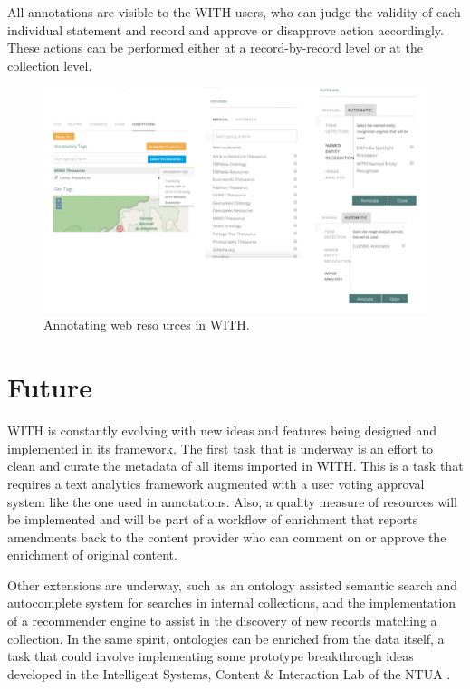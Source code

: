 \documentclass[runningheads,a4paper]{llncs}
\makeatletter
\def\maxwidth#1{\ifdim\Gin@nat@width>#1 #1\else\Gin@nat@width\fi}
\makeatother
\begin{document}
All annotations are visible to the WITH users, who can judge the validity of each individual statement and record and approve or disapprove action accordingly. These actions can be performed either at a record-by-record level or at the collection level. 
\begin{figure}[h!]
\centering
\includegraphics[width=\maxwidth{\textwidth}]{./img/image2.png}
\cprotect\caption{Annotating web reso urces in WITH.}
\label{figure2}
\end{figure}


\section{Future}

WITH is constantly evolving with new ideas and features being designed and implemented in its framework. The first task that is underway is an effort to clean and curate the metadata of all items imported in WITH. This is a task that requires a text analytics framework augmented with a user voting approval system like the one used in annotations. Also, a quality measure of resources will be implemented and will be part of a workflow of enrichment that reports amendments back to the content provider who can comment on or approve the enrichment of original content.

Other extensions are underway, such as an ontology assisted semantic search and autocomplete system for searches in internal collections, and the implementation of a recommender engine to assist in the discovery of new records matching a collection. In the same spirit, ontologies can be enriched from the data itself, a task that could involve implementing some prototype breakthrough ideas developed in the Intelligent Systems, Content \& Interaction Lab of the NTUA  \cite{_Ref490496660}.
\end{document}
